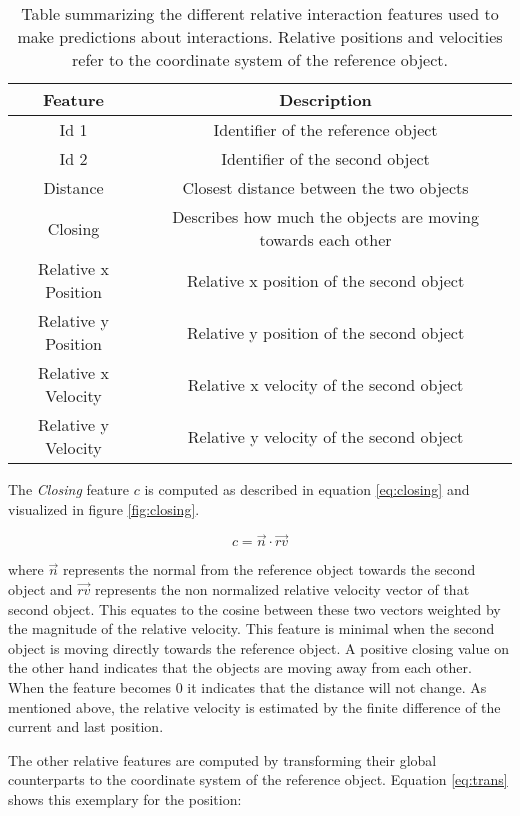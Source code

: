 \begin{table}
	\centering
	\begin{tabular}{|c|c|}
		\hline Feature & Description \\ 
		\hline Id 1 & Identifier of the reference object \\ 
		\hline Id 2 & Identifier of the second object \\ 
		\hline Distance & Closest distance between the two objects \\
		\hline Closing & Describes how much the objects are moving towards each other \\
		\hline Relative x Position & Relative x position of the second object \\
		\hline Relative y Position & Relative y position of the second object \\
		\hline Relative x Velocity & Relative x velocity of the second object \\
		\hline Relative y Velocity & Relative y velocity of the second object \\
		\hline 
	\end{tabular} 
	\caption{Table summarizing the different relative interaction features used to make predictions about interactions. Relative positions and velocities refer to the coordinate system of the reference object.}
	\label{tab:gateInteractionFeatures}
\end{table}

The \textit{Closing} feature $c$ is computed as described in equation \ref{eq:closing} and visualized in figure \ref{fig:closing}.

\begin{equation}
  c = \vec{n} \cdot \vec{rv}
 \label{eq:closing}
\end{equation}

where $\vec{n}$ represents the normal from the reference object towards the second object and $\vec{rv}$ represents the non normalized relative velocity vector of that second object. This equates to the cosine between these two vectors weighted by the magnitude of the relative velocity. This feature is minimal when the second object is moving directly towards the reference object. A positive closing value on the other hand indicates that the objects are moving away from each other. When the feature becomes 0 it indicates that the distance will not change. As mentioned above, the relative velocity is estimated by the finite difference of the current and last position.

The other relative features are computed by transforming their global counterparts to the coordinate system of the reference object. Equation \ref{eq:trans} shows this exemplary for the position:

